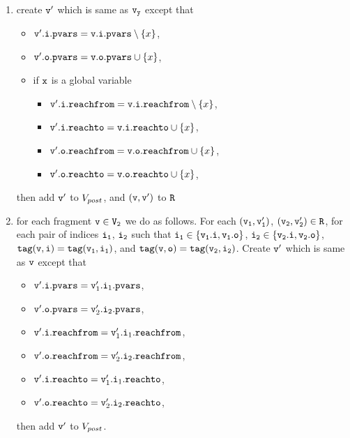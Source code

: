\begin{itemize}
\begin{enumerate}
\item create $\tt v'$ which is same as $\tt \mathtt{v}_y$ except that
\begin{itemize}
\item $\mathtt{v}'.\mathtt{i}.\mathtt{pvars} = \mathtt{v}.\mathtt{i}.\mathtt{pvars} \setminus \left\{x\right\}$,
\item $\mathtt{v}'.\mathtt{o}.\mathtt{pvars} = \mathtt{v}.\mathtt{o}.\mathtt{pvars} \cup \left\{x\right\}$,
\item if $\tt x$ is a global variable
\begin{itemize}
\item $\mathtt{v}'.\mathtt{i}.\mathtt{reachfrom} = \mathtt{v}.\mathtt{i}.\mathtt{reachfrom} \setminus \left\{x\right\}$,
\item $\mathtt{v}'.\mathtt{i}.\mathtt{reachto} = \mathtt{v}.\mathtt{i}.\mathtt{reachto} \cup \left\{x\right\}$,
 \item $\mathtt{v}'.\mathtt{o}.\mathtt{reachfrom} = \mathtt{v}.\mathtt{o}.\mathtt{reachfrom} \cup \left\{x\right\}$,
 \item $\mathtt{v}'.\mathtt{o}.\mathtt{reachto} = \mathtt{v}.\mathtt{o}.\mathtt{reachto} \cup \left\{x\right\}$,
\end{itemize}
\end{itemize}
then add $\tt v'$ to $V_{post}$, and $\tt (v,v')$ to $\tt R$
%

\item for each fragment $\tt v \in V_2$ we do as follows. For each $\tt (\mathtt{v}_1,\mathtt{v}_1')$, $\tt (\mathtt{v}_2,\mathtt{v}_2') \in R$, for each pair of indices $\tt i_1$, $\tt i_2$ such that $\tt i_1 \in \{\mathtt{v}_1.i, \mathtt{v}_1.o\}$, $\tt i_2 \in \{\mathtt{v}_2.i, \mathtt{v}_2.o\}$, $\tt tag(v,i) = tag(\mathtt{v}_1, i_1)$, and $\tt tag(v,o) = tag(\mathtt{v}_2, i_2)$. Create $\tt v'$ which is same as $\tt v$ except that 
\begin{itemize}
\item $\mathtt{v}'.\mathtt{i}.\mathtt{pvars} = \mathtt{v}_1'.\mathtt{i}_1.\mathtt{pvars}$,
\item $\mathtt{v}'.\mathtt{o}.\mathtt{pvars} = \mathtt{v}_2'.\mathtt{i}_2.\mathtt{pvars}$,
\item $\mathtt{v}'.\mathtt{i}.\mathtt{reachfrom} = \mathtt{v}_1'.\mathtt{i}_1.\mathtt{reachfrom}$,
\item $\mathtt{v}'.\mathtt{o}.\mathtt{reachfrom} = \mathtt{v}_2'.\mathtt{i}_2.\mathtt{reachfrom}$,
\item $\mathtt{v}'.\mathtt{i}.\mathtt{reachto} = \mathtt{v}_1'.\mathtt{i}_1.\mathtt{reachto}$,
\item $\mathtt{v}'.\mathtt{o}.\mathtt{reachto} =  \mathtt{v}_2'.\mathtt{i}_2.\mathtt{reachto}$,
\end{itemize} then add $\tt v'$ to $V_{post}$. 
\end{enumerate}





\end{itemize}
